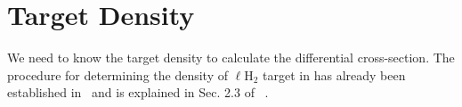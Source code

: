 \section{Target Density}\label{sec:analysis.target_density}

We need to know the target density to calculate the differential cross-section. The procedure for determining the density of $\ell$H$_2$ target in  has already been established in~\cite{clas.target.density} and is explained in Sec. 2.3 of ~\cite{g12note}. 

%
%

